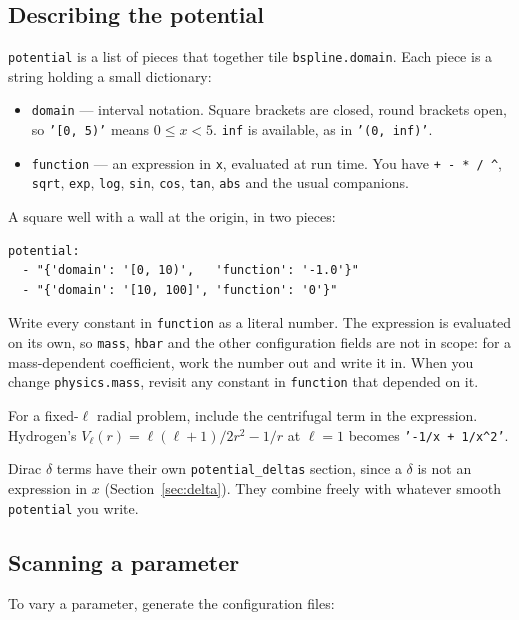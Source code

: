 \documentclass[11pt]{article}
\begin{document}
\subsection{Describing the potential}

\texttt{potential} is a list of pieces that together tile
\texttt{bspline.domain}. Each piece is a string holding a small dictionary:

\begin{itemize}[nosep]
\item \texttt{domain} --- interval notation. Square brackets are closed, round
      brackets open, so \texttt{'[0, 5)'} means $0 \le x < 5$. \texttt{inf} is
      available, as in \texttt{'(0, inf)'}.
\item \texttt{function} --- an expression in \texttt{x}, evaluated at run time.
      You have \texttt{+ - * / \^{}}, \texttt{sqrt}, \texttt{exp},
      \texttt{log}, \texttt{sin}, \texttt{cos}, \texttt{tan}, \texttt{abs} and
      the usual companions.
\end{itemize}

A square well with a wall at the origin, in two pieces:
\begin{lstlisting}[style=yaml]
potential:
  - "{'domain': '[0, 10)',   'function': '-1.0'}"
  - "{'domain': '[10, 100]', 'function': '0'}"
\end{lstlisting}

Write every constant in \texttt{function} as a literal number. The expression
is evaluated on its own, so \texttt{mass}, \texttt{hbar} and the other
configuration fields are not in scope: for a mass-dependent coefficient, work
the number out and write it in. When you change \texttt{physics.mass}, revisit
any constant in \texttt{function} that depended on it.

For a fixed-$\ell$ radial problem, include the centrifugal term in the
expression. Hydrogen's $V_\ell(r) = \ell(\ell+1)/2r^{2} - 1/r$ at $\ell = 1$
becomes \texttt{'-1/x + 1/x\^{}2'}.

Dirac $\delta$ terms have their own \texttt{potential\_deltas} section, since a
$\delta$ is not an expression in $x$ (Section~\ref{sec:delta}). They combine
freely with whatever smooth \texttt{potential} you write.

\subsection{Scanning a parameter}

To vary a parameter, generate the configuration files:
\end{document}
